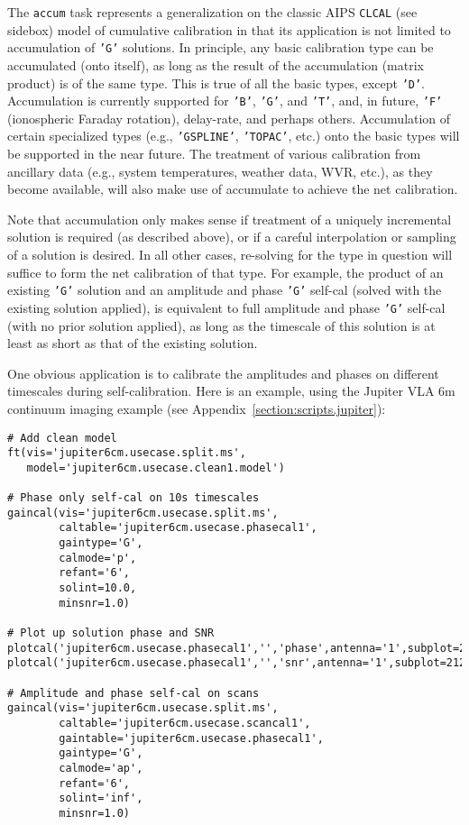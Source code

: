 {The {\tt accum} task represents a generalization on the classic AIPS
{\tt CLCAL} (see sidebox) model of cumulative calibration in that its
application is not limited to accumulation of {\tt 'G'} solutions. 
In principle, any
basic calibration type can be accumulated (onto itself), as long as the
result of the accumulation (matrix product) is of the same type. This is
true of all the basic types, except {\tt 'D'}. Accumulation is currently
supported for {\tt 'B'}, {\tt 'G'}, and {\tt 'T'}, and, in future,
{\tt 'F'} (ionospheric Faraday rotation), delay-rate, and perhaps
others. Accumulation of certain specialized
types (e.g., {\tt 'GSPLINE'}, {\tt 'TOPAC'}, etc.) onto the basic types will be
supported in the near future. The treatment of various calibration from
ancillary data (e.g., system temperatures, weather data, WVR, etc.), as
they become available, will also make use of accumulate to achieve the net
calibration.

Note that accumulation only makes sense if treatment of a uniquely
incremental solution is required (as described above), or if a careful
interpolation or sampling of a solution is desired. In all other cases,
re-solving for the type in question will suffice to form the net
calibration of that type. For example, the product of an existing {\tt 'G'}
solution and an amplitude and phase {\tt 'G'} self-cal (solved with the
existing solution applied), is equivalent to full amplitude and phase
{\tt 'G'} self-cal (with no prior solution applied), as long as the timescale
of this solution is at least as short as that of the existing solution.

One obvious application is to calibrate the amplitudes and phases
on different timescales during self-calibration.
Here is an example, using the Jupiter VLA 6m continuum imaging 
example (see Appendix~\ref{section:scripts.jupiter}):
\small
\begin{verbatim}
# Add clean model 
ft(vis='jupiter6cm.usecase.split.ms',
   model='jupiter6cm.usecase.clean1.model')

# Phase only self-cal on 10s timescales
gaincal(vis='jupiter6cm.usecase.split.ms',
        caltable='jupiter6cm.usecase.phasecal1',
        gaintype='G',
        calmode='p',
        refant='6',
        solint=10.0,
        minsnr=1.0)

# Plot up solution phase and SNR
plotcal('jupiter6cm.usecase.phasecal1','','phase',antenna='1',subplot=211)
plotcal('jupiter6cm.usecase.phasecal1','','snr',antenna='1',subplot=212)

# Amplitude and phase self-cal on scans
gaincal(vis='jupiter6cm.usecase.split.ms',
        caltable='jupiter6cm.usecase.scancal1',
        gaintable='jupiter6cm.usecase.phasecal1',
        gaintype='G',
        calmode='ap',
        refant='6',
        solint='inf',
        minsnr=1.0)


\end{verbatim}}
